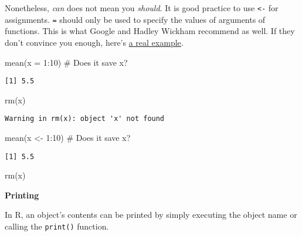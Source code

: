 \documentclass[
  letterpaper,
  DIV=11,
  numbers=noendperiod]{scrreprt}
\newenvironment{Shaded}{\begin{snugshade}}{\end{snugshade}}
\newcommand{\AttributeTok}[1]{\textcolor[rgb]{0.40,0.45,0.13}{#1}}
\newcommand{\CommentTok}[1]{\textcolor[rgb]{0.37,0.37,0.37}{#1}}
\newcommand{\DecValTok}[1]{\textcolor[rgb]{0.68,0.00,0.00}{#1}}
\newcommand{\FunctionTok}[1]{\textcolor[rgb]{0.28,0.35,0.67}{#1}}
\newcommand{\NormalTok}[1]{\textcolor[rgb]{0.00,0.23,0.31}{#1}}
\newcommand{\OtherTok}[1]{\textcolor[rgb]{0.00,0.23,0.31}{#1}}
\newcommand{\SpecialCharTok}[1]{\textcolor[rgb]{0.37,0.37,0.37}{#1}}
\begin{document}
Nonetheless, \emph{can} does not mean you \emph{should}. It is good
practice to use \texttt{\textless{}-} for assignments. \texttt{=} should
only be used to specify the values of arguments of functions. This is
what Google and Hadley Wickham recommend as well. If they don't convince
you enough, here's
\href{https://csgillespie.wordpress.com/2010/11/16/assignment-operators-in-r-vs/}{a
real example}.

\begin{Shaded}
\begin{Highlighting}[]
\FunctionTok{mean}\NormalTok{(}\AttributeTok{x =} \DecValTok{1}\SpecialCharTok{:}\DecValTok{10}\NormalTok{) }\CommentTok{\# Does it save x?}
\end{Highlighting}
\end{Shaded}

\begin{verbatim}
[1] 5.5
\end{verbatim}

\begin{Shaded}
\begin{Highlighting}[]
\FunctionTok{rm}\NormalTok{(x)}
\end{Highlighting}
\end{Shaded}

\begin{verbatim}
Warning in rm(x): object 'x' not found
\end{verbatim}

\begin{Shaded}
\begin{Highlighting}[]
\FunctionTok{mean}\NormalTok{(x }\OtherTok{\textless{}{-}} \DecValTok{1}\SpecialCharTok{:}\DecValTok{10}\NormalTok{) }\CommentTok{\# Does it save x?}
\end{Highlighting}
\end{Shaded}

\begin{verbatim}
[1] 5.5
\end{verbatim}

\begin{Shaded}
\begin{Highlighting}[]
\FunctionTok{rm}\NormalTok{(x)}
\end{Highlighting}
\end{Shaded}

\textbf{Printing}

In R, an object's contents can be printed by simply executing the object
name or calling the \texttt{print()} function.
\end{document}
